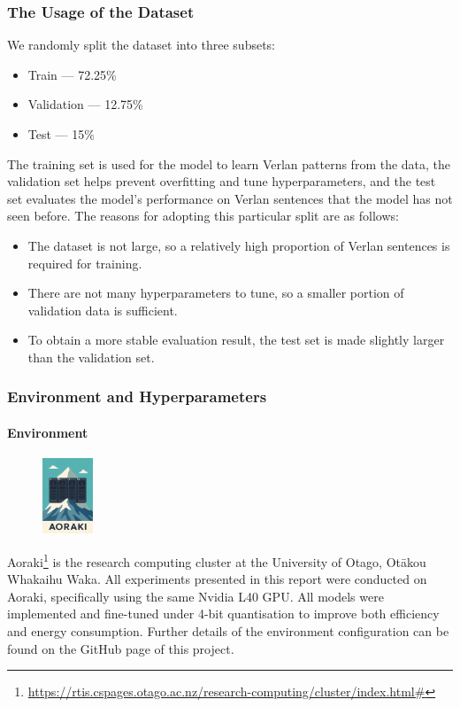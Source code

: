 \documentclass[12pt]{article}
\begin{document}
\subsubsection{The Usage of the Dataset}

We randomly split the dataset into three subsets:

\begin{itemize}
  \item Train --- 72.25\%
  \item Validation --- 12.75\%
  \item Test --- 15\%
\end{itemize}

The training set is used for the model to learn Verlan patterns from the data, 
the validation set helps prevent overfitting and tune hyperparameters, 
and the test set evaluates the model's performance on Verlan sentences that the model has not seen before.  
The reasons for adopting this particular split are as follows:

\begin{itemize}
  \item The dataset is not large, so a relatively high proportion of Verlan sentences is required for training.
  \item There are not many hyperparameters to tune, so a smaller portion of validation data is sufficient.
  \item To obtain a more stable evaluation result, the test set is made slightly larger than the validation set.
\end{itemize}


\subsubsection{Environment and Hyperparameters}

\paragraph{Environment}
\begin{figure}
  \vspace{-60pt}
  \begin{minipage}{1\linewidth}
    \centering
    \includegraphics[width=1.5cm]{figures/aoraki.png}
  \end{minipage}%
\end{figure}
Aoraki\footnote{\url{https://rtis.cspages.otago.ac.nz/research-computing/cluster/index.html\#}} 
is the research computing cluster at the University of Otago, Otākou Whakaihu Waka. 
All experiments presented in this report were conducted on Aoraki, specifically using the same Nvidia L40 GPU. 
All models were implemented and fine-tuned under 4-bit quantisation to improve both efficiency and energy consumption. 
Further details of the environment configuration can be found on the GitHub page of this project.
\end{document}
